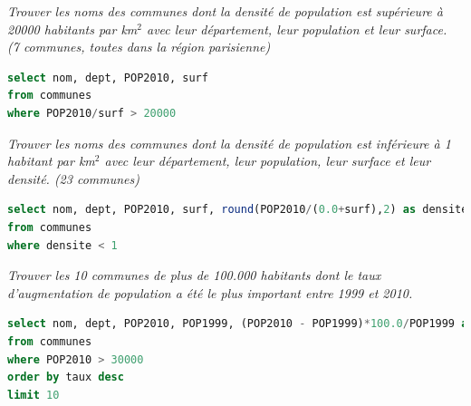 \begin{Exercise}
\textit{Trouver les noms des communes dont la densité de population est supérieure à 20000 habitants par km$^2$ avec leur département, leur population et leur surface.\\
(7 communes, toutes dans la région parisienne)}
\end{Exercise}
\begin{Answer}
\begin{lstlisting}[language=SQL]
select nom, dept, POP2010, surf
from communes 
where POP2010/surf > 20000
\end{lstlisting}
\end{Answer}
\begin{Exercise}
\textit{Trouver les noms des communes dont la densité de population est inférieure à 1 habitant par km$^2$ avec leur département, leur population, leur surface et leur densité. (23 communes)}
\end{Exercise}
\begin{Answer}
\begin{lstlisting}[language=SQL]
select nom, dept, POP2010, surf, round(POP2010/(0.0+surf),2) as densite
from communes 
where densite < 1
\end{lstlisting}
\end{Answer}
\begin{Exercise}
\textit{Trouver les 10 communes de plus de 100.000 habitants dont le taux d'augmentation de population a été le plus important entre 1999 et 2010.}
\end{Exercise}
\begin{Answer}
\begin{lstlisting}[language=SQL]
select nom, dept, POP2010, POP1999, (POP2010 - POP1999)*100.0/POP1999 as taux
from communes 
where POP2010 > 30000
order by taux desc
limit 10
\end{lstlisting}
\end{Answer}
